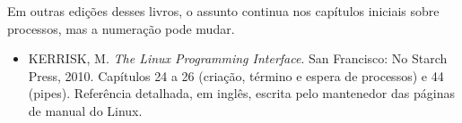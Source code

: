 \documentclass[11pt,a4paper]{article}
\begin{document}
Em outras edições desses livros, o assunto continua nos capítulos iniciais sobre processos, mas a numeração pode mudar.

\begin{itemize}
    \item KERRISK, M. \emph{The Linux Programming Interface}. San Francisco: No Starch Press, 2010. Capítulos 24 a 26 (criação, término e espera de processos) e 44 (pipes). Referência detalhada, em inglês, escrita pelo mantenedor das páginas de manual do Linux.
\end{itemize}
\end{document}
